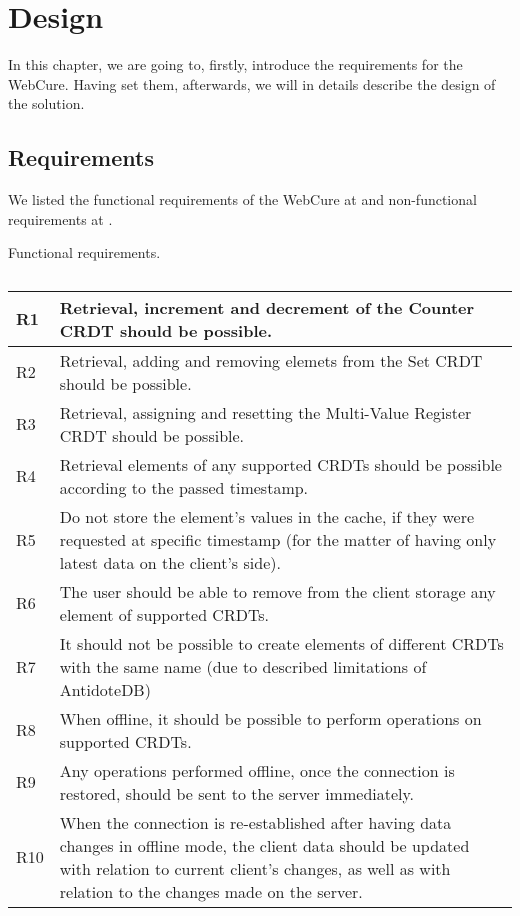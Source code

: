 \chapter{Design}
\label{Design}

In this chapter, we are going to, firstly, introduce the requirements for the WebCure. Having set them, afterwards, we will in details describe the design of the solution.

\section{Requirements}
\label{Requirements}

We listed the functional requirements of the WebCure at  and non-functional requirements at .

\begin{table}[!htb]
\centering
\caption{Functional requirements.}
\label{table:req1}
\begin{tabular}{|p{1cm}|p{12cm}|}
\hline
R1 & Retrieval, increment and decrement of the Counter CRDT should be possible.                         \\ \hline
R2 & Retrieval, adding and removing elemets from the Set CRDT should be possible.                       \\ \hline
R3 & Retrieval, assigning and resetting the Multi-Value Register CRDT should be possible.               \\ \hline
R4 & Retrieval elements of any supported CRDTs should be possible according to the passed timestamp. \\ \hline
R5 & Do not store the element's values in the cache, if they were requested at specific timestamp (for the matter of having only latest data on the client's side). \\ \hline
R6 & The user should be able to remove from the client storage any element of supported CRDTs. \\ \hline
R7 & It should not be possible to create elements of different CRDTs with the same name (due to described limitations of AntidoteDB) \\ \hline
R8 & When offline, it should be possible to perform operations on supported CRDTs. \\ \hline
R9 & Any operations performed offline, once the connection is restored, should be sent to the server immediately. \\ \hline
R10 & When the connection is re-established after having data changes in offline mode, the client data should be updated with relation to current client's changes, as well as with relation to the changes made on the server. \\ \hline
\end{tabular}
\caption*{}
\end{table}

